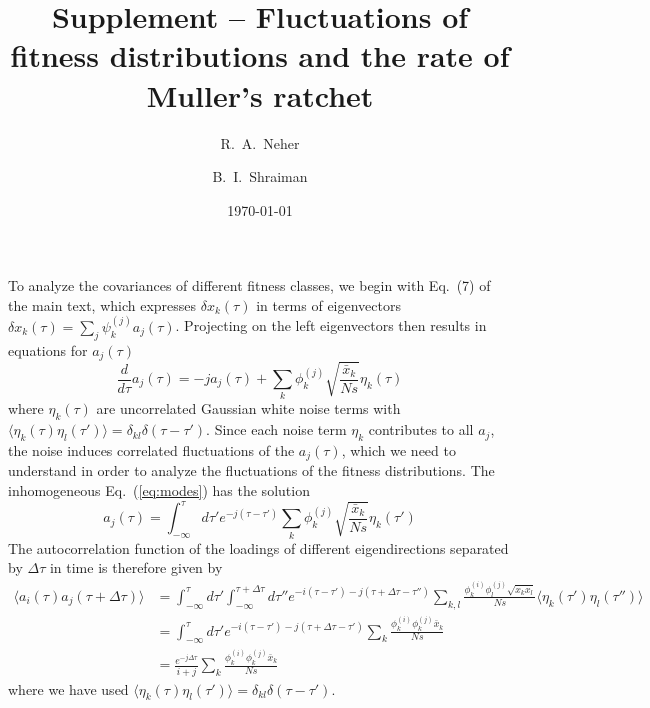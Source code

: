 \documentclass[prl,preprint]{revtex4}
\newcommand{\EQ}[1]{Eq.~(\ref{eq:#1})}
\newcommand{\x}{x}
\newcommand{\xs}{\bar{\x}}
\newcommand{\dx}{\delta \x}
\newcommand{\mr}[1]{\psi^{(#1)}}
\newcommand{\ml}[1]{\phi^{(#1)}}
\newcommand{\la}{\langle}
\newcommand{\ra}{\rangle}
\begin{document}
\title{Supplement -- Fluctuations of fitness distributions and the rate of Muller's ratchet}
\author{R.~A.~Neher}
\author{B.~I.~Shraiman}
\date{\today}
\maketitle



To analyze the covariances of different fitness classes, we begin with Eq.~(7) of the main text, which expresses $\dx_k(\tau)$ in terms of eigenvectors $\dx_k(\tau) = \sum_j \mr{j}_k a_j(\tau)$. Projecting on the left eigenvectors then results in equations for $a_j(\tau)$
\begin{equation}
\label{eq:modes}
\frac{d}{d\tau} a_j(\tau) = -j a_j(\tau) + \sum_k \ml{j}_k \sqrt{\frac{\xs_k}{Ns}} \eta_k(\tau)
\end{equation}
where $\eta_k(\tau)$ are uncorrelated Gaussian white noise terms with $\la \eta_k(\tau) \eta_l(\tau')\ra = \delta_{kl}\delta(\tau-\tau')$. Since each noise term $\eta_k$ contributes to all $a_j$, the noise induces correlated fluctuations of the $a_j(\tau)$, which we need to understand in order to analyze the fluctuations of the fitness distributions. The inhomogeneous \EQ{modes} has the  solution
\begin{equation}
a_j(\tau) = \int_{-\infty}^{\tau}d\tau' e^{-j(\tau-\tau')} \sum_k \ml{j}_k \sqrt{\frac{\xs_k}{Ns}} \eta_k(\tau')
\end{equation}
The autocorrelation function of the loadings of different eigendirections separated by $\Delta \tau$ in time is therefore given by
\begin{equation}
\begin{split}
\langle a_i(\tau) a_j(\tau+\Delta\tau)\rangle &= \int_{-\infty}^\tau d\tau'\int_{-\infty}^{\tau+\Delta\tau} d\tau'' e^{-i(\tau-\tau')-j(\tau+\Delta\tau -\tau'')}\sum_{k,l} \frac{\ml{i}_k\ml{j}_l\sqrt{\xs_k\xs_l}}{Ns} \langle \eta_k(\tau')\eta_l(\tau'')\rangle\\
&=  \int_{-\infty}^\tau d\tau' e^{-i(\tau-\tau')-j(\tau+\Delta\tau -\tau')}\sum_{k} \frac{\ml{i}_k\ml{j}_k\xs_k}{Ns}\\
&= \frac{e^{-j\Delta\tau}}{i+j}\sum_{k} \frac{\ml{i}_k\ml{j}_k\xs_k}{Ns}
\end{split}
\end{equation}
where we have used $\la \eta_k(\tau) \eta_l(\tau')\ra = \delta_{kl}\delta(\tau-\tau')$.
\end{document}
